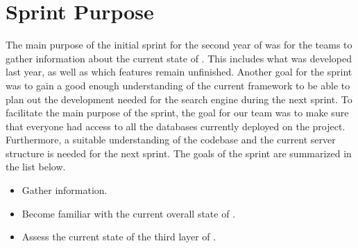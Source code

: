 \section{Sprint Purpose}
The main purpose of the initial sprint for the second year of \knox{} was for the teams to gather information about the current state of \knox{}.
This includes what was developed last year, as well as which features remain unfinished. 
Another goal for the sprint was to gain a good enough understanding of the current framework to be able to plan out the development needed for the search engine during the next sprint. 
To facilitate the main purpose of the sprint, the goal for our team was to make sure that everyone had access to all the databases currently deployed on the \knox{} project. 
Furthermore, a suitable understanding of the codebase and the current server structure is needed for the next sprint.
The goals of the sprint are summarized in the list below.

\begin{itemize}
    \item Gather information.
    \item Become familiar with the current overall state of \knox{}.
    \item Assess the current state of the third layer of \knox{}.
\end{itemize}